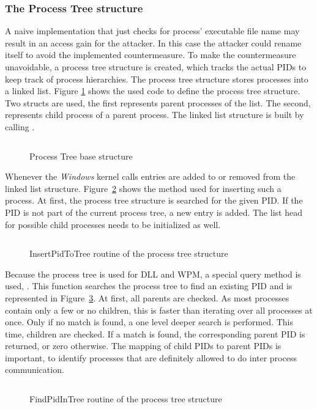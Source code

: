 \subsubsection{The Process Tree structure}
A naive implementation that just checks for process' executable file name may result in an access gain for the attacker. In this case the attacker could rename itself to avoid the implemented countermeasure. To make the countermeasure unavoidable, a process tree structure is created, which tracks the actual \glspl{PID} to keep track of process hierarchies. The process tree structure stores processes into a linked list. Figure \ref{code:code1} shows the used code to define the process tree structure. Two structs are used, the first  represents parent processes of the list. The second,  represents child process of a parent process. The linked list structure is built by calling  \cite{msdn_initlisthead}.
\begin{figure}[h]
\inputminted[breakanywhere, breaklines,fontsize=\scriptsize, frame=single, mathescape, linenos, numbersep=5pt, numbersep=5pt, xleftmargin=0pt]{c}{sections/implementation/code1.c}
\caption{Process Tree base structure}
\label{code:code1}
\end{figure}
Whenever the \emph{Windows} kernel calls  entries are added to or removed from the linked list structure. Figure~\ref{code:code2} shows the method used for inserting such a process. At first, the process tree structure is searched for the given \gls{PID}. If the \gls{PID} is not part of the current process tree, a new entry is added. The list head for possible child processes needs to be initialized as well.
\begin{figure}[h]
\inputminted[breakanywhere, breaklines,fontsize=\scriptsize, frame=single, mathescape, linenos, numbersep=5pt, numbersep=5pt, xleftmargin=0pt]{c}{sections/implementation/code2.c}
\caption{InsertPidToTree routine of the process tree structure}
\label{code:code2}
\end{figure}
Because the process tree is used for \gls{DLL} and \gls{WPM}, a special query method is used, . This function searches the process tree to find an existing \gls{PID} and is represented in Figure~\ref{code:code3}. At first, all parents are checked. As most processes contain only a few or no children, this is faster than iterating over all processes at once. Only if no match is found, a one level deeper search is performed. This time, children are checked. If a match is found, the corresponding parent \gls{PID} is returned, or zero otherwise. The mapping of child \glspl{PID} to parent \glspl{PID} is important, to identify processes that are definitely allowed to do inter process communication.
\begin{figure}[h]
\inputminted[breakanywhere, breaklines,fontsize=\scriptsize, frame=single, mathescape, linenos, numbersep=5pt, numbersep=5pt, xleftmargin=0pt]{c}{sections/implementation/code3.c}
\caption{FindPidInTree routine of the process tree structure}
\label{code:code3}
\end{figure}

